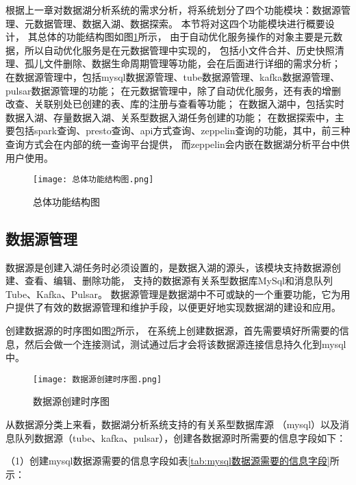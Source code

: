 根据上一章对数据湖分析系统的需求分析，将系统划分了四个功能模块：数据源管理、元数据管理、数据入湖、数据探索。
本节将对这四个功能模块进行概要设计，
其总体的功能结构图如图\ref{fig:总体功能结构图}所示，
由于自动优化服务操作的对象主要是元数据，所以自动优化服务是在元数据管理中实现的，
包括小文件合并、历史快照清理、孤儿文件删除、数据生命周期管理等功能，会在后面进行详细的需求分析；
在数据源管理中，包括mysql数据源管理、tube数据源管理、kafka数据源管理、pulsar数据源管理的功能；
在元数据管理中，除了自动优化服务，还有表的增删改查、关联别处已创建的表、库的注册与查看等功能；
在数据入湖中，包括实时数据入湖、存量数据入湖、关系型数据入湖任务创建的功能；
在数据探索中，主要包括spark查询、presto查询、api方式查询、zeppelin查询的功能，其中，前三种查询方式会在内部的统一查询平台提供，
而zeppelin会内嵌在数据湖分析平台中供用户使用。

\begin{figure}[H]
  \centering
  \texttt{[image: 总体功能结构图.png]}
  \caption{总体功能结构图}
  \label{fig:总体功能结构图}
\end{figure}

\subsection{数据源管理}


数据源是创建入湖任务时必须设置的，是数据入湖的源头，该模块支持数据源创建、查看、编辑、删除功能，
支持的数据源有关系型数据库MySql和消息队列Tube、Kafka、Pulsar。
数据源管理是数据湖中不可或缺的一个重要功能，它为用户提供了有效的数据源管理和维护手段，以便更好地实现数据湖的建设和应用。

创建数据源的时序图如图\ref{fig:数据源创建时序图}所示，
在系统上创建数据源，首先需要填好所需要的信息，然后会做一个连接测试，测试通过后才会将该数据源连接信息持久化到mysql中。

\begin{figure}[H]
  \centering
  \texttt{[image: 数据源创建时序图.png]}
  \caption{数据源创建时序图}
  \label{fig:数据源创建时序图}
\end{figure}

从数据源分类上来看，数据湖分析系统支持的有关系型数据库源
（mysql）以及消息队列数据源（tube、kafka、pulsar），创建各数据源时所需要的信息字段如下：

（1）创建mysql数据源需要的信息字段如表\ref{tab:mysql数据源需要的信息字段}所示：

